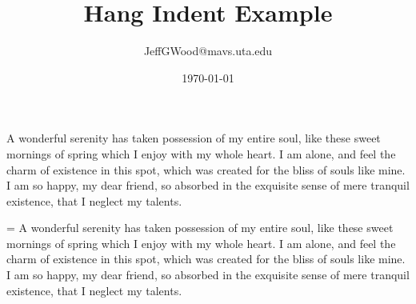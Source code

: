 \documentclass[a4paper,10pt]{article}
\title{Hang Indent Example}
\author{JeffGWood@mavs.uta.edu}
\date{\today}
\begin{document}
\linewidth 300pt

\newcommand\mytext{A wonderful serenity has taken possession of my entire soul, like
these sweet mornings of spring which I enjoy with my whole heart. I am
alone, and feel the charm of existence in this spot, which was created
for the bliss of souls like mine. I am so happy, my dear friend, so
absorbed in the exquisite sense of mere tranquil existence, that I
neglect my talents.}

\mytext

\hangindent=\parindent
\parindent 0pt
\mytext
\end{document}
